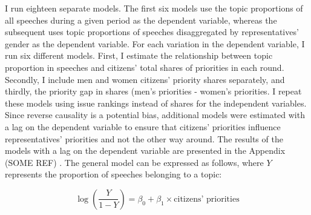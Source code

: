I run eighteen separate models. The first six models use the topic proportions of all speeches during a given period as the dependent variable, whereas the subsequent uses topic proportions of speeches disaggregated by representatives' gender as the dependent variable. For each variation in the dependent variable, I run six different models. First, I estimate the relationship between topic proportion in speeches and citizens' total shares of priorities in each round. Secondly, I include men and women citizens' priority shares separately, and thirdly, the priority gap in shares (men's priorities - women's priorities. I repeat these models using issue rankings instead of shares for the independent variables. Since reverse causality is a potential bias, additional models were estimated with a lag on the dependent variable to ensure that citizens' priorities influence representatives' priorities and not the other way around. The results of the models with a lag on the dependent variable are presented in the Appendix (SOME REF) . The general model can be expressed as follows, where \(Y\) represents the proportion of speeches belonging to a topic:


\begin{equation}
    \log\left(\frac{Y}{1 - Y}\right) = \beta_0 + \beta_1 \times \text{citizens' priorities} 
\end{equation}









